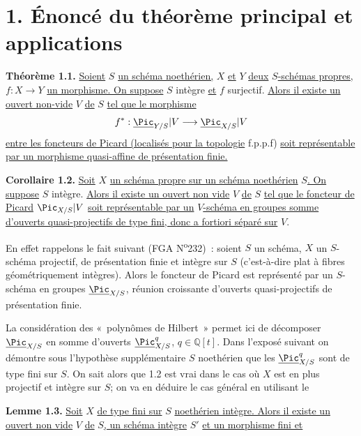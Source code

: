 \section*{1. Énoncé du théorème principal et applications}

\textbf{Théorème 1.1.} \uline{Soient} \(S\) \uline{un schéma noethérien,} \(X\) \uline{et} \(Y\) \uline{deux} \(S\)\uline{-schémas propres,} \(f:X\to Y\) \uline{un morphisme. On suppose} \(S\) intègre \uline{et} \(f\) surjectif. \uline{Alors il existe un ouvert non-vide} \(V\) \uline{de} \(S\) \uline{tel que le morphisme}
\[
  f^*:\underline{\Pic}_{Y/S}|V\longrightarrow \underline{\Pic}_{X/S}|V
\]
\uline{entre les foncteurs de Picard (localisés pour la topologie} f.p.p.f) \uline{soit représentable par un morphisme quasi-affine de présentation finie.}

\textbf{Corollaire 1.2.} \uline{Soit} \(X\) \uline{un schéma propre sur un schéma noethérien} \(S\)\uline{. On suppose} \(S\) intègre. \uline{Alors il existe un ouvert non vide} \(V\) \uline{de} \(S\) \uline{tel que le foncteur de Picard} \(\Pic_{X/S}|V\) \uline{soit représentable par un} \(V\)\uline{-schéma en groupes somme d'ouverts quasi-projectifs de type fini, donc a fortiori séparé sur} \(V\).

En effet rappelons le fait suivant (FGA N\textsuperscript{o}232)~: soient \(S\) un schéma, \(X\) un \(S\)-schéma projectif, de présentation finie et intègre sur \(S\) (c'est-à-dire plat à fibres géométriquement intègres). Alors le foncteur de Picard est représenté par un \(S\)-schéma en groupes \(\underline{\Pic}_{X/S}\), réunion croissante d'ouverts quasi-projectifs de présentation finie.

La considération des «~polynômes de Hilbert~» permet ici de décomposer \(\underline{\Pic}_{X/S}\) en somme d'ouverts \(\underline{\Pic}^q_{X/S}\), \(q\in\mathbb Q[t]\). Dans l'exposé suivant on démontre sous l'hypothèse supplémentaire \(S\) noethérien que les \(\underline{\Pic}^q_{X/S}\) sont de type fini sur \(S\). On sait alors que 1.2 est vrai dans le cas où \(X\) est en plus projectif et intègre sur \(S\); on va en déduire le cas général en utilisant le

\textbf{Lemme 1.3.} \uline{Soit} \(X\) \uline{de type fini sur} \(S\) \uline{noethérien intègre. Alors il existe un ouvert non vide} \(V\) \uline{de} \(S\)\uline{, un schéma intègre} \(S'\) \uline{et un morphisme fini et}

